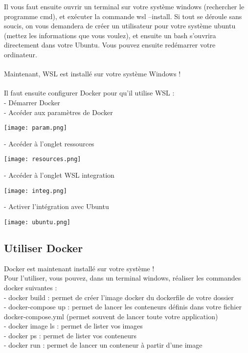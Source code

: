 \documentclass{article}
\begin{document}
    Il vous faut ensuite ouvrir un terminal sur votre système windows (rechercher le programme cmd), et exécuter la commande wsl --install. Si tout se déroule sans soucis, on vous demandera de créer un utilisateur pour votre système ubuntu (mettez les informations que vous voulez), et ensuite un bash s'ouvrira directement dans votre Ubuntu. Vous pouvez ensuite redémarrer votre ordinateur.\\\\

    Maintenant, WSL est installé sur votre système Windows !\\\\
    
    Il faut ensuite configurer Docker pour qu'il utilise WSL : \\
    - Démarrer Docker\\
    - Accéder aux paramètres de Docker \\
    \begin{center}
        \texttt{[image: param.png]}
    \end{center}
    \indent- Accéder à l'onglet ressources \\
    \begin{center}
        \texttt{[image: resources.png]}
    \end{center}
    \indent- Accéder à l'onglet WSL integration \\
    \begin{center}
        \texttt{[image: integ.png]}
    \end{center}
    \indent- Activer l'intégration avec Ubuntu \\
    \begin{center}
        \texttt{[image: ubuntu.png]}
    \end{center}
    
    \subsection{Utiliser Docker}

    Docker est maintenant installé sur votre système !\\
    Pour l'utiliser, vous pouvez, dans un terminal windows, réaliser les commandes docker suivantes :\\
    \indent- docker build : permet de créer l'image docker du dockerfile de votre dossier\\
    \indent- docker-compose up : permet de lancer les conteneurs définis dans votre fichier docker-compose.yml (permet souvent de lancer toute votre application)\\
    \indent- docker image ls : permet de lister vos images\\
    \indent- docker ps : permet de lister vos conteneurs\\
    \indent- docker run : permet de lancer un conteneur à partir d'une image\\
    
\end{document}
